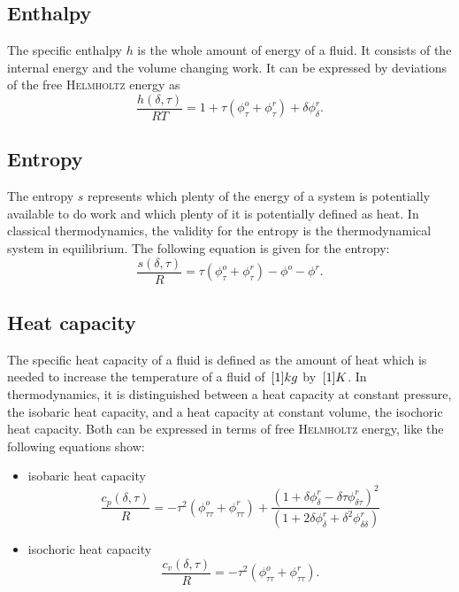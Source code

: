 \subsection{Enthalpy}

The specific enthalpy $h$ is the whole amount of energy of a fluid. It consists of the internal energy and the volume changing work. It can be expressed by deviations of the free \textsc{Helmholtz} energy as
%
\begin{equation}
\frac{h(\delta,\tau)}{RT}=1+\tau\left(\phi^o_\tau+\phi^r_\tau\right)+\delta\phi^r_\delta.
\label{eq-fhe-enthalpy}
\end{equation}

\subsection{Entropy}

The entropy $s$ represents which plenty of the energy of a system is potentially available to do work and which plenty of it is potentially defined as heat. In classical thermodynamics, the validity for the entropy is the thermodynamical system in equilibrium. The following equation is given for the entropy:
%
\begin{equation}
\frac{s(\delta,\tau)}{R}=\tau\left(\phi^o_\tau+\phi^r_\tau\right)-\phi^o-\phi^r.
\label{eq-fhe-entropy}
\end{equation}

\subsection{Heat capacity}

The specific heat capacity of a fluid is defined as the amount of heat which is needed to increase the temperature of a fluid of $\, \mathrm{[}1]{kg}$ by $\, \mathrm{[}1]{K}$. In thermodynamics, it is distinguished between a heat capacity at constant pressure, the isobaric heat capacity, and a heat capacity at constant volume, the isochoric heat capacity. Both can be expressed in terms of free \textsc{Helmholtz} energy, like the following equations show:
%
\begin{itemize}
%
\item[]isobaric heat capacity
\begin{equation}
\frac{c_p(\delta,\tau)}{R}=-\tau^2\left(\phi^o_{\tau\tau}+\phi^r_{\tau\tau}\right)+\frac{\left(1+\delta\phi^r_\delta-\delta\tau\phi^r_{\delta\tau}\right)^2}{\left(1+2\delta\phi^r_\delta+\delta^2\phi^r_{\delta\delta}\right)} 
\label{eq-fhe-isobar}
\end{equation}
%
\item[]isochoric heat capacity
\begin{equation}
\frac{c_v(\delta,\tau)}{R}=-\tau^2\left(\phi^o_{\tau\tau}+\phi^r_{\tau\tau}\right).
\label{eq-fhe-isochor}
\end{equation}
\end{itemize}

